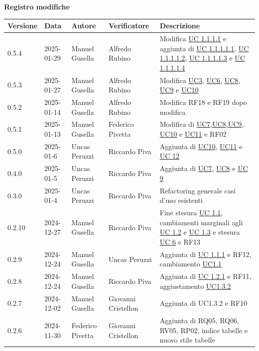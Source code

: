 \documentclass[11pt]{article}
\begin{document}
\centering\textbf{Registro modifiche}\\
\vspace{2mm}
\begin{tabularx}{\textwidth}{|l|l|l|l|X|}
\hline
\textbf{Versione} & \textbf{Data} & \textbf{Autore} & \textbf{Verificatore} & \textbf{Descrizione} \\
\hline
0.5.4 & 2025-01-29 & Manuel Gusella & Alfredo Rubino & Modifica \hyperref[UC1.1.1.1]{UC 1.1.1.1} e aggiunta di \hyperref[UC1.1.1.1.1]{UC 1.1.1.1.1}, \hyperref[UC1.1.1.1.2]{UC 1.1.1.1.2}, \hyperref[UC1.1.1.1.3]{UC 1.1.1.1.3} e \hyperref[UC1.1.1.1.4]{UC 1.1.1.1.4}\\
\hline
0.5.3 & 2025-01-27 & Manuel Gusella & Alfredo Rubino & Modifica \hyperref[UC3]{UC3}, \hyperref[UC6]{UC6}, \hyperref[UC8]{UC8}, \hyperref[UC9]{UC9} e \hyperref[UC10]{UC10}\\
\hline
0.5.2 & 2025-01-14 & Manuel Gusella & Alfredo Rubino & Modifica RF18 e RF19 dopo modifica\\
\hline
0.5.1 & 2025-01-13 & Manuel Gusella & Federico Pivetta & Modifica di \hyperref[UC7]{UC7},\hyperref[UC8]{UC8},\hyperref[UC9]{UC9}, \hyperref[UC10]{UC10} e \hyperref[UC11]{UC11} e RF02\\
\hline
0.5.0 & 2025-01-6 & Uncas Peruzzi & Riccardo Piva & Aggiunta di \hyperref[UC10]{UC10}, \hyperref[UC11]{UC11} e \hyperref[UC12]{UC 12}\\
\hline
0.4.0 & 2025-01-5 & Uncas Peruzzi & Riccardo Piva & Aggiunta di \hyperref[UC7]{UC7}, \hyperref[UC8]{UC8} e \hyperref[UC9]{UC 9}\\
\hline
0.3.0 & 2025-01-4 & Uncas Peruzzi & Riccardo Piva & Refactoring generale casi d'uso esistenti\\
\hline
0.2.10 & 2024-12-27 & Manuel Gusella & Riccardo Piva & Fine stesura \hyperref[UC1.1]{UC 1.1}, cambiamenti marginali agli \hyperref[UC1.2]{UC 1.2} e \hyperref[UC1.3]{UC 1.3} e stesura \hyperref[UC6]{UC 6} e RF13\\
\hline
0.2.9 & 2024-12-24 & Manuel Gusella & Uncas Peruzzi & Aggiunta di \hyperref[UC1.1.1]{UC 1.1.1} e RF12, cambiamento \hyperref[UC1.1]{UC1.1} \\
\hline
0.2.8 & 2024-12-24 & Manuel Gusella & Riccardo Piva & Aggiunta di \hyperref[UC1.2.1]{UC 1.2.1} e RF11, aggiustamento \hyperref[UC1.3.2]{UC1.3.2} \\
\hline
0.2.7 & 2024-12-02 & Manuel Gusella & Giovanni Cristellon & Aggiunta di UC1.3.2 e RF10 \\
\hline
0.2.6 & 2024-11-30 & Federico Pivetta & Giovanni Cristellon & Aggiunta di RQ05, RQ06, RV05, RP02, indice tabelle e nuovo stile tabelle \\

\end{tabularx}
\end{document}
